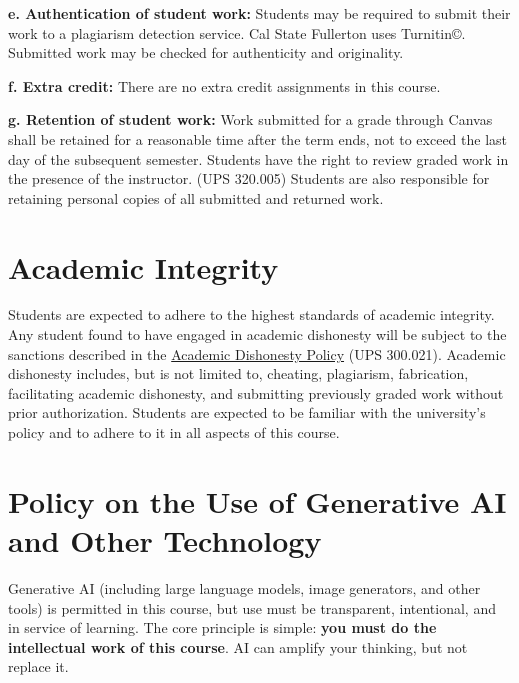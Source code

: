 \documentclass[12pt]{article}
\begin{document}
\vspace{1em}
\noindent \textbf{e. Authentication of student work:}
Students may be required to submit their work to a plagiarism detection service. Cal State Fullerton uses Turnitin\copyright. Submitted work may be checked for authenticity and originality.

\vspace{1em}
\noindent \textbf{f. Extra credit:}
There are no extra credit assignments in this course.

\vspace{1em}
\noindent \textbf{g. Retention of student work:}
Work submitted for a grade through Canvas shall be retained for a reasonable time after the term ends, not to exceed the last day of the subsequent semester. Students have the right to review graded work in the presence of the instructor. (UPS 320.005) Students are also responsible for retaining personal copies of all submitted and returned work.

\section*{Academic Integrity}
Students are expected to adhere to the highest standards of academic integrity. Any student found to have engaged in academic dishonesty will be subject to the sanctions described in the \href{https://www.fullerton.edu/senate/publications_policies_resolutions/ups/UPS\%20300/UPS\%20300.021.pdf}{Academic Dishonesty Policy} (UPS 300.021). Academic dishonesty includes, but is not limited to, cheating, plagiarism, fabrication, facilitating academic dishonesty, and submitting previously graded work without prior authorization. Students are expected to be familiar with the university's policy and to adhere to it in all aspects of this course.

\section*{Policy on the Use of Generative AI and Other Technology}

Generative AI (including large language models, image generators, and other tools) is permitted in this course, but use must be transparent, intentional, and in service of learning. The core principle is simple: \textbf{you must do the intellectual work of this course}. AI can amplify your thinking, but not replace it.
\end{document}

